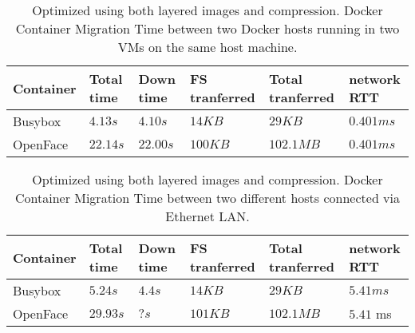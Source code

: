 \begin{table}[!t]
\renewcommand{\arraystretch}{2.5}
\centering

\caption{Optimized using both layered images and compression. Docker Container Migration Time between two Docker hosts running in two VMs on the same host machine.}
\label{table_samehost_opt}


\begin{tabular}{|M{1.2cm}|M{0.9cm}|M{0.9cm}|M{1.4cm}|M{1.1cm}|M{0.9cm}|}
\hline
Container & {Total time}  & {Down time} & { FS tranferred} & { Total tranferred } & { network RTT } \\ \hline
Busybox & $4.13s$ & $4.10s$ & $14KB$ & $29KB$ & $0.401 ms$\\\hline
OpenFace & $22.14 s$ & $22.00s$ & $100KB$ & $102.1MB$ & $0.401ms$ \\\hline
\end{tabular}
\end{table}

\begin{table}[!t]
\renewcommand{\arraystretch}{2.5}
\centering

\caption{Optimized using both layered images and compression. Docker Container Migration Time between two different hosts connected via Ethernet LAN.}
\label{table_ethernet_opt}

\begin{tabular}{|M{1.2cm}|M{0.9cm}|M{0.9cm}|M{1.4cm}|M{1.1cm}|M{0.9cm}|}
\hline
Container & {Total time}  & {Down time} & { FS tranferred} & { Total tranferred } & { network RTT } \\ \hline 
Busybox & $5.24s$ & $4.4s$ & $14KB$ & $29KB$ & $5.41 ms$\\\hline
OpenFace & $29.93s$ & $?s$ & $101KB$ & $102.1MB$ & $5.41$ ms\\\hline
\end{tabular}

\end{table}


